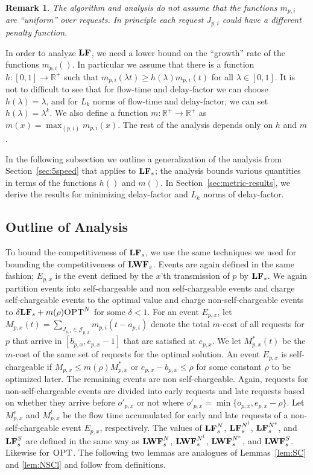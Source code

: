 \documentclass[11pt]{article}
\newtheorem{remark}[lemma]{Remark}
\newcommand{\opt}{\textrm{\sc OPT}}
\newcommand{\grdy}{\Algorithm{LF}}
\newcommand{\len}{\mathfrak{\rho}}
\newcommand{\optn}{\opt^{N}}
\begin{document}
\begin{titlepage}
\begin{remark}
  The algorithm and analysis do not assume that the functions $m_{p,i}$
  are ``uniform'' over requests.  In principle each request $J_{p,i}$
  could have a different penalty function.
\end{remark}
In order to analyze $\grdy$, we need a lower bound on the ``growth''
rate of the functions $m_{p,i}()$. In particular we assume that there
is a function $h: [0,1] \rightarrow \mathbb{R}^+$ such that
$m_{p,i}(\lambda t) \ge h(\lambda) m_{p,i}(t)$ for all $\lambda \in
[0,1]$. It is not to difficult to see that for flow-time and delay-factor
we can choose $h(\lambda) = \lambda$, and for $L_k$ norms of
flow-time and delay-factor, we can set $h(\lambda) = \lambda^k$.
We also define a function $m:  \mathbb{R}^+ \rightarrow \mathbb{R}^+$
as $m(x) = \max_{(p,i)} m_{p,i}(x)$. The rest of the analysis depends
only on $h$ and $m$.

In the following subsection we outline a generalization of the
analysis from Section~\ref{sec:5speed} that applies to $\grdy_s$; the
analysis bounds various quantities in terms of the functions $h()$ and
$m()$.  In Section~\ref{sec:metric-results}, we derive the results for
minimizing delay-factor and $L_k$ norms of delay-factor.
\vspace{-2.5mm}

\subsection{Outline of Analysis} \vspace{-2mm}
\label{sec:gen-framework} To bound the competitiveness of $\grdy_s$, we use the same techniques we used for bounding
the competitiveness of ${\texttt{\bf{LWF}}}_s$. Events are again defined in the same fashion; $E_{p,x}$ is the event defined by the
$x$'th transmission of $p$ by $\grdy_s$. We again partition events into self-chargeable and non self-chargeable events
and charge self-chargeable events to the optimal value and charge non-self-chargeable events to $\delta \grdy_s +
m(\len) \optn$ for some $\delta < 1$. For an event $E_{p,x}$, let $M_{p,x}(t) = \sum_{J_{p,i} \in \mathcal{J}_{p,x}}
m_{p,i}(t-a_{p,i})$ denote the total $m$-cost of all requests for $p$ that arrive in $[b_{p,x}, e_{p,x}-1]$ that are
satisfied at $e_{p,x}$. We let $M^*_{p,x}(t)$ be the $m$-cost of the same set of requests for the optimal solution. An
event $E_{p,x}$ is self-chargeable if $M_{p,x} \le m(\len) M^*_{p,x}$ or $e_{p,x} - b_{p,x} \le \len$ for some constant
$\len$ to be optimized later. The remaining events are non self-chargeable.  Again, requests for non-self-chargeable
events are divided into early requests and late requests based on whether they arrive before $o'_{p,x}$ or not where
$o'_{p,x} = \min\{o_{p,x}, e_{p,x}-\len\}$.  Let $M^e_{p,x}$ and $M^l_{p,x}$ be the flow time accumulated for early and
late requests of a non-self-chargeable event $E_{p,x}$, respectively.  The values of $\grdy_s^{N}$, $\grdy_s^{N^l}$,
$\grdy_s^{N^e}$, and $\grdy_s^{S}$ are defined in the same way as ${\texttt{\bf{LWF}}}_s^{N}$, ${\texttt{\bf{LWF}}}_s^{N^l}$, ${\texttt{\bf{LWF}}}_s^{N^e}$, and
${\texttt{\bf{LWF}}}_s^{S}$. Likewise for $\opt$.  The following two lemmas are analogues of Lemmas~\ref{lem:SC} and \ref{lem:NSCl}
and follow from definitions.


\end{titlepage}
\end{document}
